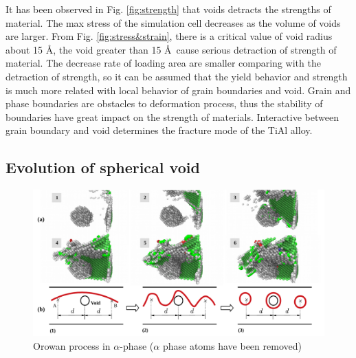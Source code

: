 \documentclass[metals,article,submit,moreauthors,pdftex,10pt,a4paper]{Definitions/mdpi}
\begin{document}
It has been observed in Fig. \ref{fig:strength} that voids detracts the strengths of  material. The max stress  of the simulation cell decreases as the volume of voids are larger. From Fig. \ref{fig:stress&strain}, there is a critical value of void radius about 15 \AA, the void greater than 15 \AA\ cause serious detraction of strength of material.  The decrease rate of loading area are smaller comparing with the detraction of strength, so it can be assumed that the  yield behavior and strength is much more related with local behavior of grain boundaries and void. Grain and phase boundaries are obstacles to deformation process, thus the stability of boundaries have great impact on the strength of materials. Interactive between grain boundary and void determines the fracture mode of the TiAl alloy.

\subsection{Evolution of spherical void}

\begin{figure}[ht]
	\centering
	\includegraphics[width=1\linewidth]{"img/orowan"}
	\caption{Orowan process in $\alpha$-phase ($\alpha$ phase atoms have been removed)}
	\label{fig:orowan}
\end{figure}
\end{document}

